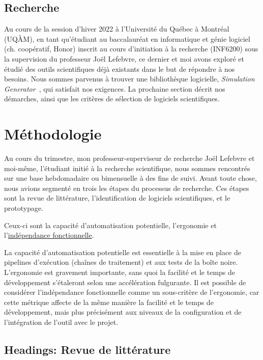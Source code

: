 \documentclass{article}
\begin{document}
  \subsection{Recherche}
  \label{subsec:research}
  Au cours de la session d'hiver 2022 à l'Université du Québec à Montréal (UQÀM), en tant qu'étudiant au baccalauréat en informatique et génie logiciel (ch.
  coopératif, Honor) inscrit au cours d'initiation à la recherche (INF6200) sous la supervision du professeur Joël Lefebvre, ce dernier et moi avons exploré et étudié
  des outils scientifiques déjà existants dans le but de répondre à nos besoins.
  Nous sommes parvenus à trouver une bibliothèque logicielle, \textit{Simulation Generator}~\citep{alexvalcourtcaron2022simulationgenerator}, qui satisfait nos exigences.
  La prochaine section décrit nos démarches, ainsi que les critères de sélection de logiciels scientifiques.


  \section{Méthodologie}
  \label{sec:methodology}
  Au cours du trimestre, mon professeur-superviseur de recherche Joël Lefebvre et moi-même, l'étudiant initié à la recherche scientifique, nous sommes rencontrés sur
  une base hebdomadaire ou bimensuelle à des fins de suivi.
  Avant toute chose, nous avions segmenté en trois les étapes du processus de recherche.
  Ces étapes sont la revue de littérature, l'identification de logiciels scientifiques, et le prototypage.


  Ceux-ci sont la capacité d'automatisation potentielle, l'ergonomie et l'\href{https://fr.wikipedia.org/wiki/Ind%C3%A9pendance_fonctionnelle}{indépendance
  fonctionnelle}.

  La capacité d'automatisation potentielle est essentielle à la mise en place de pipelines d'exécution (chaînes de traitement) et aux tests de la boîte noire.
  L'ergonomie est gravement importante, sans quoi la facilité et le temps de développement s'étaleront selon une accélération fulgurante.
  Il est possible de considérer l'indépendance fonctionnelle comme un sous-critère de l'ergonomie, car cette métrique affecte de la même manière la facilité et le
  temps de développement, mais plus précisément aux niveaux de la configuration et de l'intégration de l'outil avec le projet.

  \subsection{Headings: Revue de littérature}
  \label{subsec:headings:literature-review}
\end{document}
